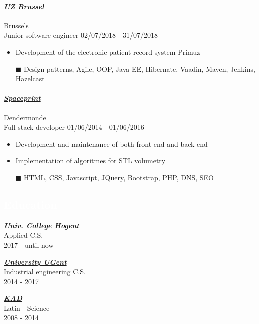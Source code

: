 \documentclass[a4paper, twoside]{article}
\begin{document}
\paragraph{\textbf{\textit{\href{https://uzbrussel.be }{\textcolor{blueDark}{ UZ Brussel }}}}} \hfill\small Brussels \\
Junior software engineer \hfill\small 02/07/2018 - 31/07/2018
\begin{itemize}
\itemsep-0.2em
\item Development of the electronic patient record system Primuz
\item[\color{orange}$\blacksquare$] Design patterns, Agile, OOP, Java EE, Hibernate, Vaadin, Maven, Jenkins, Hazelcast
\end{itemize}
\paragraph{\textbf{\textit{\href{https:// }{\textcolor{blueDark}{ Spaceprint }}}}} \hfill\small Dendermonde \\
Full stack developer \hfill\small 01/06/2014 - 01/06/2016
\begin{itemize}
\itemsep-0.2em
\item Development and maintenance of both front end and back end
\item Implementation of algoritmes for STL volumetry
\item[\color{orange}$\blacksquare$] HTML, CSS, Javascript, JQuery, Bootstrap, PHP, DNS, SEO
\end{itemize}
\begin{mdframed}
\section*{\textcolor{white}{ Education }}
\end{mdframed}
\begin{multicols}{ 3 }
\setlength{\parindent}{0pt}
\par
\textbf{\textit{\href{https://hogent.be }{\textcolor{blueDark}{ Univ. College Hogent }}}}\\
Applied C.S.\\ \small 2017 - until now
\setlength{\parindent}{0pt}
\par
\textbf{\textit{\href{https://ugent.be }{\textcolor{blueDark}{ University UGent }}}}\\
Industrial engineering C.S.\\ \small 2014 - 2017
\setlength{\parindent}{0pt}
\par
\textbf{\textit{\href{https://kad.be }{\textcolor{blueDark}{ KAD }}}}\\
Latin - Science\\ \small 2008 - 2014
\end{multicols}
\end{document}
